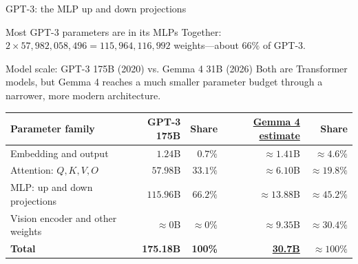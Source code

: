\begin{frame}{GPT-3: the MLP up and down projections}
  \vspace{-0.4em}
  \begin{alertblock}{Most GPT-3 parameters are in its MLPs}
    \centering
    Together: \(2\times57{,}982{,}058{,}496
      =115{,}964{,}116{,}992\) weights---about \(66\%\) of GPT-3.
  \end{alertblock}
\end{frame}

\begin{frame}{Model scale: GPT-3 175B (2020) vs. Gemma 4 31B (2026)}
  \small
  Both are Transformer models, but Gemma 4 reaches a much smaller parameter
  budget through a narrower, more modern architecture.

  \begin{center}
  \end{center}

  \vspace{-0.7em}
  \begin{center}
    \scriptsize
    \renewcommand{\arraystretch}{1.22}
    \begin{tabular}{@{}lrrrr@{}}
      \toprule
      Parameter family & GPT-3 175B & Share &
        \href{https://chatgpt.com/share/6a56a6e4-0c14-83ed-849e-93f362e5f1c3}{Gemma 4 estimate} & Share \\
      \midrule
      Embedding and output & \(1.24\)B & \(0.7\%\) & \(\approx1.41\)B & \(\approx4.6\%\) \\
      Attention: \(Q,K,V,O\) & \(57.98\)B & \(33.1\%\) & \(\approx6.10\)B & \(\approx19.8\%\) \\
      MLP: up and down projections & \(115.96\)B & \(66.2\%\) & \(\approx13.88\)B & \(\approx45.2\%\) \\
      Vision encoder and other weights & \(\approx0\)B & \(\approx0\%\) & \(\approx9.35\)B & \(\approx30.4\%\) \\
      \midrule
      \textbf{Total} & \textbf{175.18B} & \textbf{100\%} &
        \href{https://ai.google.dev/gemma/docs/core/model_card_4}{\textbf{30.7B}} & \textbf{\(\approx100\%\)} \\
      \bottomrule
    \end{tabular}
  \end{center}


\end{frame}
